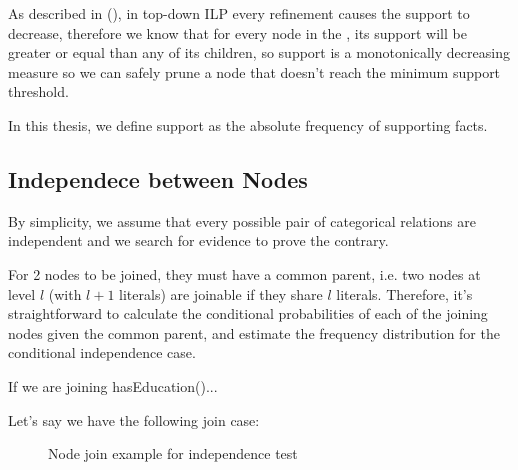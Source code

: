 As described in (\cite{LavracDz94}), in top-down ILP every refinement causes the support to decrease, therefore we know that for every node in the \graphname, its support will be greater or equal than any of its children, so support is a monotonically decreasing measure so we can safely prune a node that doesn't reach the minimum support threshold.

In this thesis, we define support as the absolute frequency of supporting facts.


\subsection{Independece between Nodes}

By simplicity, we assume that every possible pair of categorical relations are independent and we search for evidence to prove the contrary.

For 2 nodes to be joined, they must have a common parent, i.e. two nodes at level $l$ (with $l+1$ literals) are joinable if they share $l$ literals. Therefore, it's straightforward to calculate the conditional probabilities of each of the joining nodes given the common parent, and estimate the frequency distribution for the conditional independence case.

If we are joining hasEducation()...

Let's say we have the following join case:
 
\begin{figure}[!h]
  \caption{Node join example for independence test}
  \centering
  \label{fig:joinIndepExample}
\end{figure}



